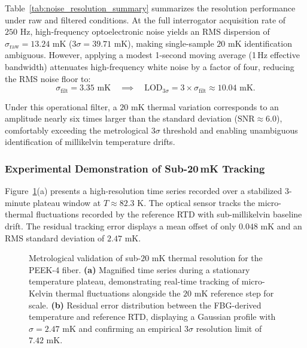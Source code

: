 \documentclass[preprint,11pt]{elsarticle}
\begin{document}
Table~\ref{tab:noise_resolution_summary} summarizes the resolution performance under raw and filtered conditions. At the full interrogator acquisition rate of $250\text{ Hz}$, high-frequency optoelectronic noise yields an RMS dispersion of $\sigma_{\text{raw}} = 13.24\text{ mK}$ ($3\sigma = 39.71\text{ mK}$), making single-sample $20\text{ mK}$ identification ambiguous. However, applying a modest 1-second moving average (1\,Hz effective bandwidth) attenuates high-frequency white noise by a factor of four, reducing the RMS noise floor to:
\begin{equation}
    \sigma_{\text{filt}} = 3.35\text{ mK} \quad \implies \quad \text{LOD}_{3\sigma} = 3 \times \sigma_{\text{filt}} \approx 10.04\text{ mK}.
\end{equation}

Under this operational filter, a $20\text{ mK}$ thermal variation corresponds to an amplitude nearly six times larger than the standard deviation ($\text{SNR} \approx 6.0$), comfortably exceeding the metrological $3\sigma$ threshold and enabling unambiguous identification of millikelvin temperature drifts.

\subsubsection{Experimental Demonstration of Sub-20\,mK Tracking}

Figure~\ref{fig:milli_kelvin_resolution}(a) presents a high-resolution time series recorded over a stabilized 3-minute plateau window at $T \approx 82.3\text{ K}$. The optical sensor tracks the micro-thermal fluctuations recorded by the reference RTD with sub-millikelvin baseline drift. The residual tracking error displays a mean offset of only $0.048\text{ mK}$ and an RMS standard deviation of $2.47\text{ mK}$.

\begin{figure}[htpb]
    \centering
    \caption{Metrological validation of sub-$20\text{ mK}$ thermal resolution for the PEEK-4 fiber. \textbf{(a)} Magnified time series during a stationary temperature plateau, demonstrating real-time tracking of micro-Kelvin thermal fluctuations alongside the $20\text{ mK}$ reference step for scale. \textbf{(b)} Residual error distribution between the FBG-derived temperature and reference RTD, displaying a Gaussian profile with $\sigma = 2.47\text{ mK}$ and confirming an empirical $3\sigma$ resolution limit of $7.42\text{ mK}$.}
    \label{fig:milli_kelvin_resolution}
\end{figure}
\end{document}
